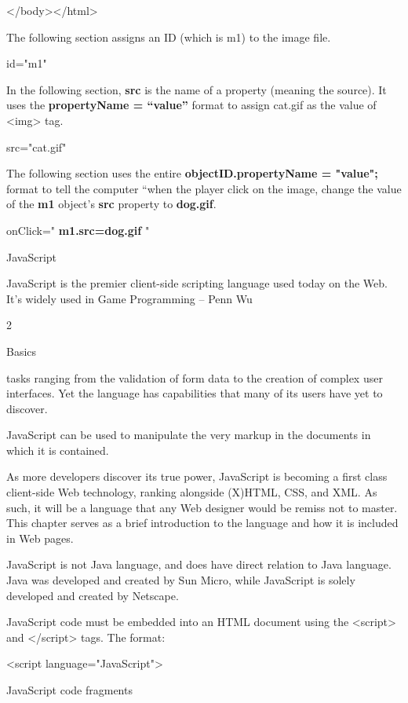 \documentclass[
]{article}
\begin{document}
\textless/body\textgreater\textless/html\textgreater{}

The following section assigns an ID (which is m1) to the image file.

id="m1"

In the following section, \textbf{src} is the name of a property
(meaning the source). It uses the \textbf{propertyName = ``value''}
format to assign cat.gif as the value of \textless img\textgreater{}
tag.

src="cat.gif"

The following section uses the entire \textbf{objectID.propertyName =
"value";} format to tell the computer ``when the player click on the
image, change the value of the \textbf{m1} object's \textbf{src}
property to \textbf{dog.gif}.

onClick=" \textbf{m1.src=\textquotesingle dog.gif\textquotesingle{}} "

JavaScript

JavaScript is the premier client-side scripting language used today on
the Web. It's widely used in Game Programming -- Penn Wu

2

\protect\hypertarget{index_split_001.htmlux5cux23p3}{}{}Basics

tasks ranging from the validation of form data to the creation of
complex user interfaces. Yet the language has capabilities that many of
its users have yet to discover.

JavaScript can be used to manipulate the very markup in the documents in
which it is contained.

As more developers discover its true power, JavaScript is becoming a
first class client-side Web technology, ranking alongside (X)HTML, CSS,
and XML. As such, it will be a language that any Web designer would be
remiss not to master. This chapter serves as a brief introduction to the
language and how it is included in Web pages.

JavaScript is not Java language, and does have direct relation to Java
language. Java was developed and created by Sun Micro, while JavaScript
is solely developed and created by Netscape.

JavaScript code must be embedded into an HTML document using the
\textless script\textgreater{} and \textless/script\textgreater{} tags.
The format:

\textless script language="JavaScript"\textgreater{}

JavaScript code fragments
\end{document}
